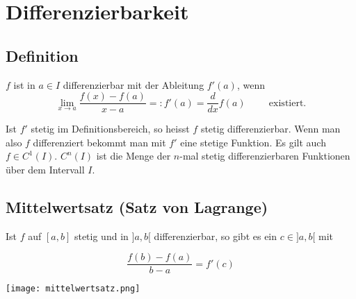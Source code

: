 \section{Differenzierbarkeit}
\subsection{Definition}
$f$ ist in $a \in I$ differenzierbar mit der Ableitung $f'(a)$, wenn
\[
\lim_{x \to a} \frac{f(x) - f(a)}{x - a} =: f'(a) = \frac{d}{dx}f(a) \hspace{1cm} \text{existiert.}
\]

Ist $f'$ stetig im Definitionsbereich, so heisst $f$ stetig differenzierbar. Wenn man also $f$ differenziert
 bekommt man mit $f'$ eine stetige Funktion. Es gilt
auch $f \in C^1(I)$. $C^n(I)$ ist die Menge der $n$-mal stetig differenzierbaren
Funktionen über dem Intervall $I$.

\subsection{Mittelwertsatz (Satz von Lagrange)}
Ist $f$ auf $[a,b]$ stetig und in $]a, b[$ differenzierbar, so gibt es ein $c
\in ]a,b[$ mit

\begin{minipage}{0.25\textwidth}
	\vspace{0pt}
	\[
	\frac{f(b) - f(a)}{b-a} = f'(c)
	\]
\end{minipage}
\begin{minipage}{0.25\textwidth}
		\vspace{0pt}
	\texttt{[image: mittelwertsatz.png]}
\end{minipage}

